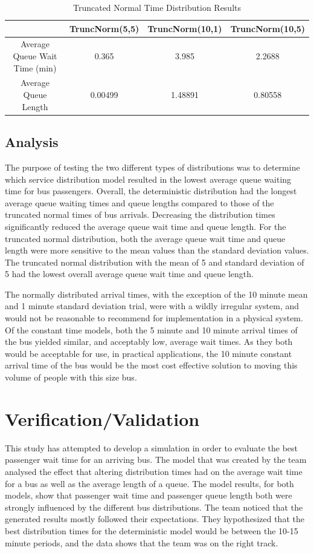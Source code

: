 \documentclass{article}
\begin{document}
    \begin{table}[h]
	\begin{center}
	\begin{tabular}{c|c|c|c}
	& TruncNorm(5,5) & TruncNorm(10,1) & TruncNorm(10,5) \\
	\hline
	Average Queue Wait Time (min) & 0.365 & 3.985 & 2.2688\\
	\hline	
	Average Queue Length & 0.00499 & 1.48891 & 0.80558\\
	\hline	
	\end{tabular}
	\caption{Truncated Normal Time Distribution Results}
	\end{center}
	\end{table}
   
   \newpage
\subsection{Analysis}
The purpose of testing the two different types of distributions was to determine which service distribution model resulted in the lowest average queue waiting time for bus passengers. Overall, the deterministic distribution had the longest average queue waiting times and queue lengths compared to those of the truncated normal times of bus arrivals. Decreasing the distribution times significantly reduced the average queue wait time and queue length. For the truncated normal distribution, both the average queue wait time and queue length were more sensitive to the mean values than the standard deviation values. The truncated normal distribution with the mean of 5 and standard deviation of 5 had the lowest overall average queue wait time and queue length. 

The normally distributed arrival times, with the exception of the 10 minute mean and 1 minute standard deviation trial, were with a wildly irregular system, and would not be reasonable to recommend for implementation in a physical system. Of the constant time models, both the 5 minute and 10 minute arrival times of the bus yielded similar, and acceptably low, average wait times. As they both would be acceptable for use, in practical applications, the 10 minute constant arrival time of the bus would be the most cost effective solution to moving this volume of people with this size bus.

\section{Verification/Validation}
This study has attempted to develop a simulation in order to evaluate the best passenger wait time for an arriving bus. The model that was created by the team analysed the effect that altering distribution times had on the average wait time for a bus as well as the average length of a queue. The model results, for both models, show that passenger wait time and passenger queue length both were strongly influenced by the different bus distributions. The team noticed that the generated results mostly followed their expectations. They hypothesized that the best distribution times for the deterministic model would be between the 10-15 minute periods, and the data shows that the team was on the right track. 
\end{document}
